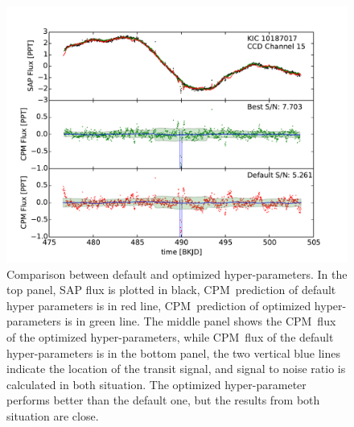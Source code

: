 \documentclass[12pt, preprint]{aastex}
\newcommand{\name}{CPM}
\begin{document}
\begin{figure}[htb]
\centering
\includegraphics[width=\columnwidth]{compare_10187017}
\caption{
  \label{hyperparameter} 
  Comparison between default and optimized hyper-parameters. 
  In the top panel, SAP flux is plotted in black, \name\ prediction of default hyper parameters is in red line, 
    \name\ prediction of optimized hyper-parameters is in green line. 
  The middle panel shows the \name\ flux of the optimized hyper-parameters, 
    while \name\ flux of the default hyper-parameters is in the bottom panel, 
    the two vertical blue lines indicate the location of the transit signal, 
    and signal to noise ratio is calculated in both situation. 
  The optimized hyper-parameter performs better than the default one, 
    but the results from both situation are close.}
\end{figure}

\clearpage
\end{document}
